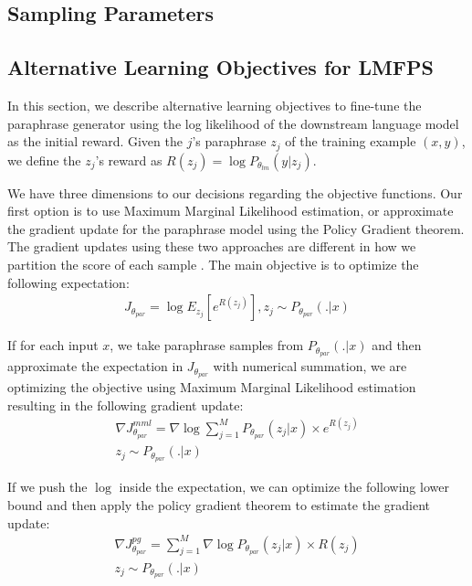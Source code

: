 \documentclass[11pt]{article}
\begin{document}
\subsection{Sampling Parameters}

\subsection{Alternative Learning Objectives for LMFPS}
In this section, we describe alternative learning objectives to fine-tune the paraphrase generator using the log likelihood of the downstream language model as the initial reward. Given the $j$'s paraphrase $z_{j}$ of the training example $(x, y)$, we define the $z_{j}$'s reward as $R(z_{j}) = \log P_{\theta_{lm}} (y | z_{j})$.

We have three dimensions to our decisions regarding the objective functions. Our first option is to use Maximum Marginal Likelihood estimation, or approximate the gradient update for the paraphrase model using the Policy Gradient theorem. The gradient updates using these two approaches are different in how we partition the score of each sample \cite{}. The main objective is to optimize the following expectation:
\begin{multline}
J_{\theta_{par}} = \log E_{z_{j}} [e^{R(z_{j})}],
z_{j} \sim P_{\theta_{par}}(.|x)
\label{main-objective}
\end{multline}

If for each input $x$, we take paraphrase samples from $P_{\theta_{par}}(.|x)$ and then approximate the expectation in $J_{\theta_{par}}$ with numerical summation, we are optimizing the objective using Maximum Marginal Likelihood estimation resulting in the following gradient update:
\begin{multline}
\nabla J^{mml}_{\theta_{par}} = \nabla \log \sum^{M}_{j=1} P_{\theta_{par}}(z_{j}|x) \times e^{R(z_{j})} \\
z_{j} \sim P_{\theta_{par}}(.|x)
\label{mml-objective}
\end{multline}

If we push the $\log$ inside the expectation, we can optimize the following lower bound and then apply the policy gradient theorem \cite{10.5555/3009657.3009806} to estimate the gradient update:
\begin{multline}
\nabla J^{pg}_{\theta_{par}} = \sum^{M}_{j=1} \nabla \log P_{\theta_{par}}(z_{j}|x) \times R(z_{j}) \\
z_{j} \sim P_{\theta_{par}}(.|x)
\label{pg-objective}
\end{multline}
\end{document}
